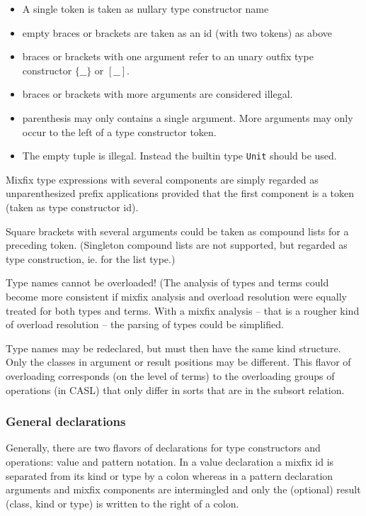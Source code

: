 \documentclass{article}
\begin{document}
\begin{itemize}
\item A single token is taken as nullary type constructor name
\item empty braces or brackets are taken as an id (with two tokens) as above
\item braces or brackets with one argument refer to an unary outfix type
  constructor $\{\_\_\}$ or $[\_\_]$.
\item braces or brackets with more arguments are considered illegal.
\item parenthesis may only contains a single argument. More arguments may only
  occur to the left of a type constructor token.
\item The empty tuple is illegal. Instead the builtin type 
  \texttt{Unit} should be used.
\end{itemize}

Mixfix type expressions with several components are simply regarded as
unparenthesized prefix applications provided that the first component is a
token (taken as type constructor id). 

Square brackets with several arguments could be taken as compound lists for a
preceding token. (Singleton compound lists are not supported, but regarded as
type construction, ie. for the list type.)

Type names cannot be overloaded! (The analysis of types and terms could
become more consistent if mixfix analysis and overload resolution were equally
treated for both types and terms. With a mixfix analysis -- that is
a rougher kind of overload resolution -- the parsing of types could
be simplified. 

Type names may be redeclared, but must then have the same kind structure. Only
the classes in argument or result positions may be different. This flavor of
overloading corresponds (on the level of terms) to the overloading groups of
operations (in CASL) that only differ in sorts that are in the
subsort relation.

\subsubsection*{General declarations}

Generally, there are two flavors of declarations for type constructors and
operations: value and pattern notation. In a value declaration a mixfix id is
separated from its kind or type by a colon whereas in a pattern declaration
arguments and mixfix components are intermingled and only the (optional)
result (class, kind or type) is written to the right of a colon. 
\end{document}
